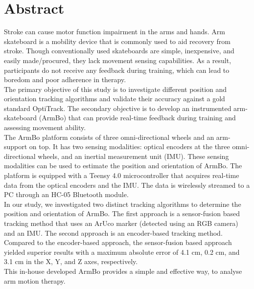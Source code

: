 \documentclass[12pt, twoside]{report}
\begin{document}
\chapter*{Abstract}

Stroke can cause motor function impairment in the arms and hands.
Arm skateboard is a mobility device that is commonly used to aid recovery from stroke.
Though conventionally used skateboards are simple, inexpensive, and easily made/procured, they lack movement sensing capabilities.
As a result, participants do not receive any feedback during training, which can lead to boredom and poor adherence in therapy.\\

The primary objective of this study is to investigate different position and orientation tracking algorithms and validate their
accuracy against a gold standard OptiTrack. The secondary objective is to develop an instrumented arm-skateboard (ArmBo)
that can provide real-time feedback during training and assessing movement ability. \\

The ArmBo platform consists of three omni-directional wheels and an arm-support on top.
It has two sensing modalities: optical encoders at the three omni-directional wheels, and an inertial measurement unit (IMU).
These sensing modalities can be used to estimate the position and orientation of ArmBo.
The platform is equipped with a Teensy 4.0 microcontroller that acquires real-time data from the optical encoders and the IMU.
The data is wirelessly streamed to a PC through an HC-05 Bluetooth module. \\

In our study, we investigated two distinct tracking algorithms to determine the position and orientation of ArmBo.
The first approach is a sensor-fusion based tracking method that uses an ArUco marker (detected using an RGB camera) and an IMU.
The second approach is an encoder-based tracking method. \\

Compared to the encoder-based approach, the sensor-fusion based approach yielded superior results
with a maximum absolute error of 4.1 cm, 0.2 cm, and 3.1 cm in the X, Y, and Z axes, respectively. \\

This in-house developed ArmBo provides a simple and effective way, to analyse arm motion therapy.\\
\end{document}

